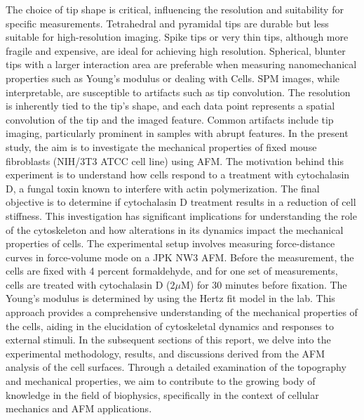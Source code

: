 \documentclass[a4paper,english,12pt,bibliography=totoc]{scrreprt}
\begin{document}
The choice of tip shape is critical, influencing the resolution and suitability for specific measurements. Tetrahedral and pyramidal tips are durable but less suitable for high-resolution imaging. Spike tips or very thin tips, although more fragile and expensive, are ideal for achieving high resolution. Spherical, blunter tips with a larger interaction area are preferable when measuring nanomechanical properties such as Young’s modulus or dealing with Cells.\newline
SPM images, while interpretable, are susceptible to artifacts such as tip convolution. The resolution is inherently tied to the tip's shape, and each data point represents a spatial convolution of the tip and the imaged feature. Common artifacts include tip imaging, particularly prominent in samples with abrupt features.\newline
In the present study, the aim is to investigate the mechanical properties of fixed mouse fibroblasts (NIH/3T3 ATCC cell line) using AFM. The motivation behind this experiment is to understand how cells respond to a treatment with cytochalasin D, a fungal toxin known to interfere with actin polymerization. The final objective is to determine if cytochalasin D treatment results in a reduction of cell stiffness. This investigation has significant implications for understanding the role of the cytoskeleton and how alterations in its dynamics impact the mechanical properties of cells.\newline
The experimental setup involves measuring force-distance curves in force-volume mode on a JPK NW3 AFM. Before the measurement, the cells are fixed with 4 percent formaldehyde, and for one set of measurements, cells are treated with cytochalasin D (\(2\mu \text{M}\)) for 30 minutes before fixation. The Young's modulus is determined by using the Hertz fit model in the lab. This approach provides a comprehensive understanding of the mechanical properties of the cells, aiding in the elucidation of cytoskeletal dynamics and responses to external stimuli.\newline
In the subsequent sections of this report, we delve into the experimental methodology, results, and discussions derived from the AFM analysis of the cell surfaces. Through a detailed examination of the topography and mechanical properties, we aim to contribute to the growing body of knowledge in the field of biophysics, specifically in the context of cellular mechanics and AFM applications.\newline
\end{document}
